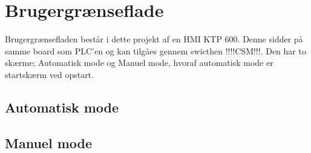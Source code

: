 
\section{Brugergrænseflade}
\label{HMI}

Brugergrænsefladen består i dette projekt af en HMI KTP 600. Denne sidder på samme board som PLC'en og kan tilgåes gennem swicthen !!!!CSM!!!. Den har to skærme; Automatisk mode og Manuel mode, hvoraf automatisk mode er startskærm ved opstart.

\subsection{Automatisk mode}

\subsection{Manuel mode}
